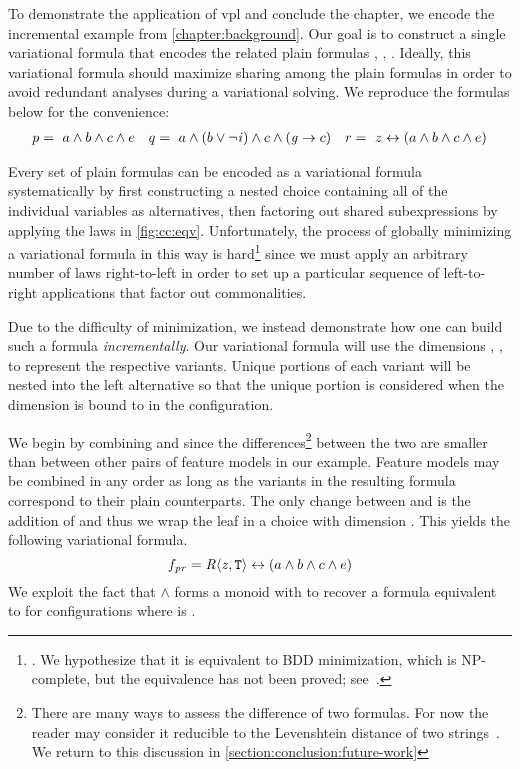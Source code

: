 \label{section:vpl:example}
%
To demonstrate the application of \ac{vpl} and conclude the chapter, we encode
the incremental example from \autoref{chapter:background}. Our goal is to
construct a single variational formula that encodes the related plain formulas
\pV{}, \qV{}, \rV{}. Ideally, this variational formula should maximize sharing
among the plain formulas in order to avoid redundant analyses during a
variational solving. We reproduce the formulas below for the convenience:
%
\begin{align*}
  p =\ a \wedge b \wedge c \wedge e && q=\ a \wedge (b \vee \neg \mathit{i}{}) \wedge c \wedge (\mathit{g}{} \rightarrow c) && r =~z \leftrightarrow (a \wedge b \wedge c \wedge e)
\end{align*}

%
Every set of plain formulas can be encoded as a variational formula
systematically by first constructing a nested choice containing all of the
individual variables as alternatives, then factoring out shared subexpressions
by applying the laws in \autoref{fig:cc:eqv}.
%
Unfortunately, the process of globally minimizing a variational formula in this
way is hard\footnote{\label{vpl:bdd}. We hypothesize that it is equivalent to
  BDD minimization, which is NP-complete, but the equivalence has not been
  proved; see~\cite{Walk14onward}.} since we must apply an arbitrary number of
laws right-to-left in order to set up a particular sequence of left-to-right
applications that factor out commonalities.

Due to the difficulty of minimization, we instead demonstrate how one can build
such a formula \emph{incrementally}.
%
Our variational formula will use the dimensions \dimP, \dimQ, \dimR{} to
represent the respective variants. Unique portions of each variant will be
nested into the left alternative so that the unique portion is considered when
the dimension is bound to \true{} in the configuration.

%
We begin by combining \pV{} and \rV{} since the differences\footnote{There are
  many ways to assess the difference of two formulas. For now the reader may
  consider it reducible to the Levenshtein distance of two
  strings~\cite{Levenshtein_SPD66}. We return to this discussion in
  \autoref{section:conclusion:future-work}} between the two are smaller than
between other pairs of feature models in our example. Feature models may be
combined in any order as long as the variants in the resulting formula
correspond to their plain counterparts. The only change between \pV{} and \rV{}
is the addition of \zV{} and thus we wrap the leaf in a choice with dimension
\dimR. This yields the following variational formula.
%
\begin{equation*}
  f_{\pV\rV} = \chc[\dimR]{\zV, \tru{}} \leftrightarrow (a \wedge b \wedge c \wedge e)
\end{equation*}
%
%
We exploit the fact that $\wedge$ forms a monoid with \tru{} to recover a
formula equivalent to \pV{} for configurations where \dimR{} is \false.

